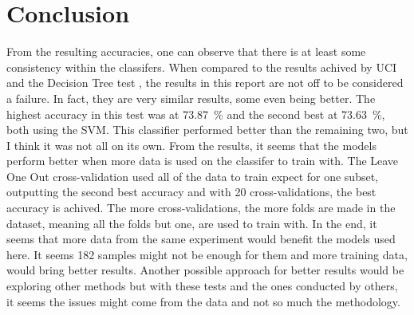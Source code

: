 \documentclass{report}
\begin{document}
\section{Conclusion}
From the resulting accuracies, one can observe that there is at least some consistency within the classifers. When compared to the results 
achived by UCI and the Decision Tree test \cite{fuzzy}, the results in this report are not off to be considered a failure. In fact, they are very similar results,
some even being better. The highest accuracy in this test was at \SI{73.87}{\percent} and the second best at \SI{73.63}{\percent}, both using the SVM. 
This classifier performed better than the remaining two, but I think it was not all on its own. From the results, it seems that the models perform better when 
more data is used on the classifer to train with. The Leave One Out cross-validation used all of the data to train expect for one subset, outputting the second 
best accuracy and with 20 cross-validations, the best accuracy is achived. The more cross-validations, the more folds are made in the dataset, meaning all the folds but one, are 
used to train with. In the end, it seems that more data from the same experiment would benefit the models used here. It seems 182 samples might not be enough for them and more training data, would bring better results. 
Another possible approach for better results would be exploring other methods but with these tests and the ones conducted by others, it seems the issues might come from the data and not so much the methodology.




\end{document}

